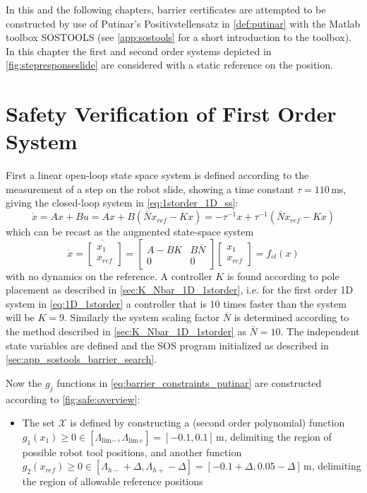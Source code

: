 In this and the following chapters, barrier certificates are attempted to be constructed by use of Putinar's Positivstellensatz in \autoref{def:putinar} with the Matlab toolbox SOSTOOLS (see \autoref{app:sostools} for a short introduction to the toolbox). In this chapter the first and second order systems depicted in \autoref{fig:stepresponseslide} are considered with a static reference on the position.




\section{Safety Verification of First Order System}
First a linear open-loop state space system is defined according to the measurement of a step on the robot slide, showing a time constant $\tau=110$\,ms, giving the closed-loop system in \autoref{eq:1storder_1D_ss}:
\begin{equation}
\dot{x} = Ax+Bu = Ax+B(\bar{N}x_{ref}-Kx) = %
-\tau^{-1}x+\tau^{-1}(\bar{N}x_{ref}-Kx)
\label{eq:1D_1storder}
\end{equation} 
which can be recast as the augmented state-space system
\begin{equation}
\dot{x}=
\dot{\begin{bmatrix}
	x_1\\x_{ref}
	\end{bmatrix}} =
\begin{bmatrix}
A-BK&B\bar{N}\\0&0
\end{bmatrix}
\begin{bmatrix}
x_1\\x_{ref}
\end{bmatrix}
= f_{cl}(x)
\end{equation}
with no dynamics on the reference. A controller $K$ is found according to pole placement as described in \autoref{sec:K_Nbar_1D_1storder}, i.e. for the first order 1D system in \autoref{eq:1D_1storder} a controller that is 10 times faster than the system will be $K=9$. Similarly the system scaling factor $\bar{N}$ is determined according to the method described in \autoref{sec:K_Nbar_1D_1storder} as $\bar{N}=10$.
The independent state variables are defined and the SOS program initialized as described in \autoref{sec:app_sostools_barrier_search}.

Now the $g_j$ functions in \autoref{eq:barrier_constraints_putinar} are constructed according to \autoref{fig:safe:overview}:
\begin{itemize}
\itemsep-0.7mm
\item The set $\mathcal{X}$ is defined by constructing a (second order polynomial) function $g_{1}(x_1)\geq 0 \in [\Lambda_{\text{lim}-},\Lambda_{\text{lim}+}]= [-0.1,0.1]$\,m, delimiting the region of possible robot tool positions, and another function $g_2(x_{ref})\geq 0 \in [\Lambda_{h-}+\Delta,\Lambda_{h+}-\Delta]=[-0.1+\Delta,0.05-\Delta]$\,m, delimiting the region of allowable reference positions 
\end{itemize}


